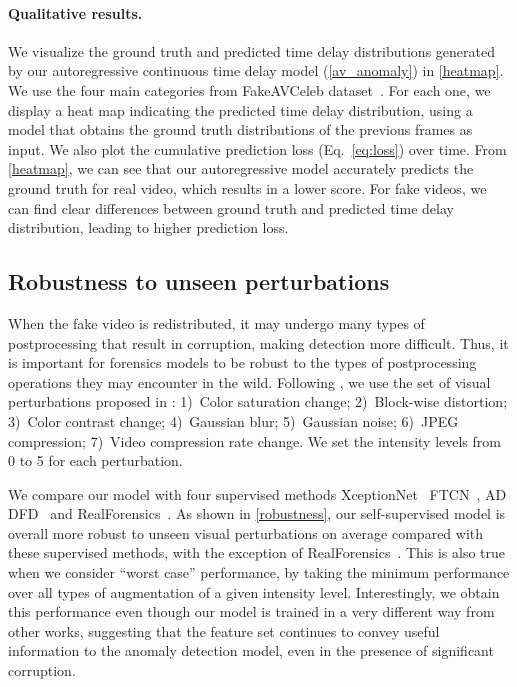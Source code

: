 \documentclass[10pt,twocolumn,letterpaper]{article}
\newcommand{\mypar}[1]{\vspace{-3mm}\paragraph{#1}}
\begin{document}
 
\mypar{Qualitative results.}
We visualize the ground truth and predicted time delay distributions generated by our autoregressive continuous time delay model (\cref{av_anomaly}) in \cref{heatmap}. We use the four main categories from FakeAVCeleb dataset~\cite{NEURIPS_DATASETS_AND_BENCHMARKS2021_d9d4f495}. For each one, we display a heat map indicating the predicted time delay distribution, using a model that obtains the ground truth distributions of the previous frames as input.
We also plot the cumulative prediction loss (Eq.~\ref{eq:loss}) over time. From \cref{heatmap}, we can see that our autoregressive model accurately predicts the ground truth for real video, which results in a lower score. For fake videos, we can find clear differences between ground truth and predicted time delay distribution, leading to higher prediction loss. 





\subsection{Robustness to unseen perturbations}\label{subsec_robustness}

When the fake video is redistributed, it may undergo many types of postprocessing that result in corruption, making detection more difficult. Thus, it is important for forensics models to be robust to the types of postprocessing operations they may encounter in the wild. Following \cite{haliassos2021lips,zheng2021exploring,haliassos2022leveraging}, we use the set of visual perturbations proposed in \cite{jiang2020deeperforensics}: 1)~Color saturation change; 2)~Block-wise distortion; 3)~Color contrast change; 4)~Gaussian blur; 5)~Gaussian noise; 6)~JPEG compression; 7)~Video compression rate change. We set the intensity levels from 0 to 5 for each perturbation. 

We compare our model with four supervised methods XceptionNet~\cite{rossler2019faceforensics++}  FTCN~\cite{zhou2021joint}, AD DFD~\cite{zhou2021joint} and RealForensics~\cite{haliassos2022leveraging}. 
As shown in \cref{robustness}, our self-supervised model is overall more robust to unseen visual perturbations on average compared with these supervised methods, with the exception of RealForensics~\cite{haliassos2022leveraging}. This is also true when we consider ``worst case'' performance, by taking the minimum performance over all types of augmentation of a given intensity level. Interestingly, we obtain this performance even though our model is trained in a very different way from other works, suggesting that the feature set continues to convey useful information to the anomaly detection model, even in the presence of significant corruption. 
\end{document}
